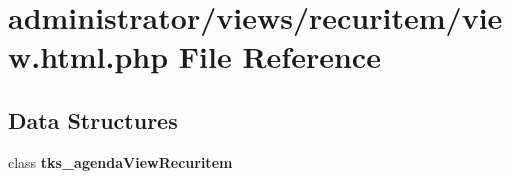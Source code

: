 \section{administrator/views/recuritem/view.html.\+php File Reference}
\label{administrator_2views_2recuritem_2view_8html_8php}
\subsection*{Data Structures}
\begin{DoxyCompactItemize}
\item 
class \textbf{ tks\+\_\+agenda\+View\+Recuritem}
\end{DoxyCompactItemize}
